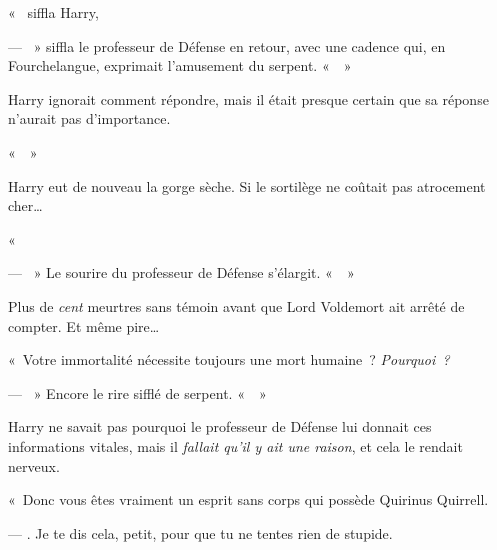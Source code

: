 «~ siffla Harry, 

--- ~» siffla le professeur de Défense en retour, avec une cadence qui, en Fourchelangue, exprimait l'amusement du serpent. «~~»

Harry ignorait comment répondre, mais il était presque certain que sa réponse n'aurait pas d'importance.

«~~»

Harry eut de nouveau la gorge sèche. Si le sortilège ne coûtait pas atrocement cher…

«~

--- ~» Le sourire du professeur de Défense s'élargit. «~~»

Plus de \emph{cent} meurtres sans témoin avant que Lord Voldemort ait arrêté de compter. Et même pire…

«~Votre immortalité nécessite toujours une mort humaine~? \emph{Pourquoi~?}

--- ~» Encore le rire sifflé de serpent. «~~»

Harry ne savait pas pourquoi le professeur de Défense lui donnait ces informations vitales, mais il \emph{fallait qu'il y ait une raison}, et cela le rendait nerveux.

«~Donc vous êtes vraiment un esprit sans corps qui possède Quirinus Quirrell.

--- . Je te dis cela, petit, pour que tu ne tentes rien de stupide.

